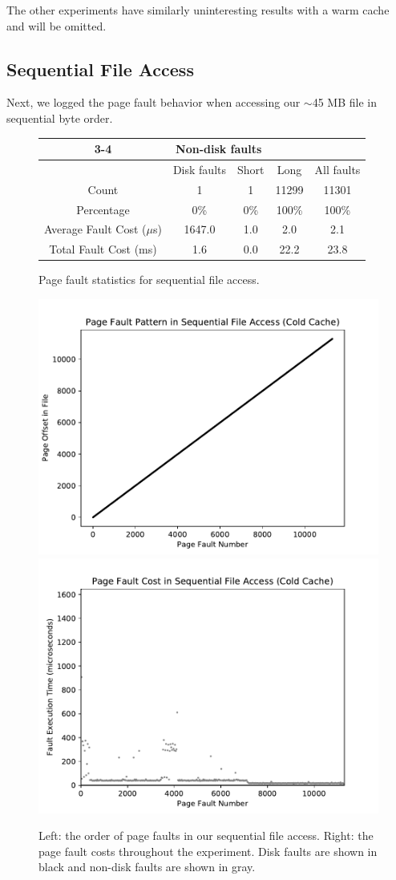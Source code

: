 \documentclass{article}
\begin{document}
	The other experiments have similarly uninteresting results with a warm cache and will be omitted.
		
\subsection{Sequential File Access}

	Next, we logged the page fault behavior when accessing our $\sim$45 MB file in sequential byte order.
	\begin{figure}[ht!]
		\centering
		\begin{tabular}{|c|c|c|c|c|}
			\cline{3-4}\multicolumn{2}{}{}&\multicolumn{2}{|c|}{Non-disk faults}\\
			\hline & Disk faults & Short & Long & All faults\\\hline
			Count & 1 & 1 & 11299 & 11301\\
			Percentage & 0\% & 0\% & 100\% & 100\% \\
			Average Fault Cost ($\mu$s) & 1647.0 & 1.0 & 2.0 & 2.1 \\
			Total Fault Cost (ms) & 1.6 & 0.0 & 22.2 & 23.8 \\\hline
		\end{tabular}
		\caption{Page fault statistics for sequential file access.}
	\end{figure}
	
	\begin{figure}[ht!]
		\centering
		\includegraphics[width=0.45\linewidth, trim=0.4cm 0.4cm 0.4cm 0.4cm]{figures/sequential1.pdf}
		\includegraphics[width=0.45\linewidth, trim=0.4cm 0.4cm 0.4cm 0.4cm]{figures/sequential2.pdf}
		\caption{Left: the order of page faults in our sequential file access. Right: the page fault costs throughout the experiment. Disk faults are shown in black and non-disk faults are shown in gray.}
	\end{figure}
	
\end{document}
